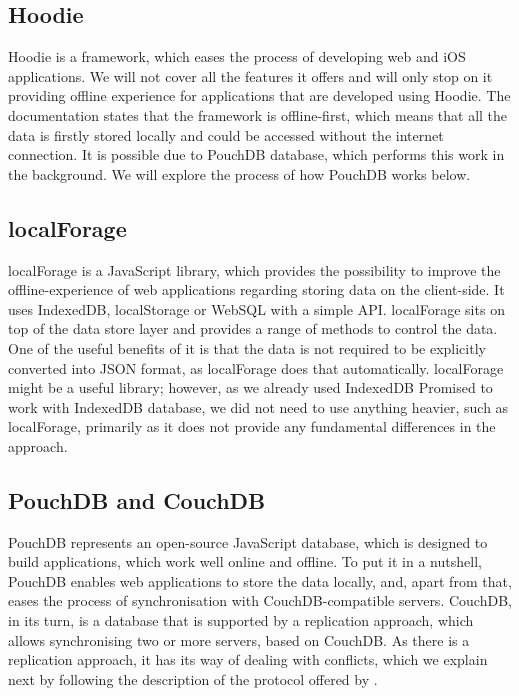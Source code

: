 \subsection*{Hoodie}

Hoodie is a framework, which eases the process of developing web and iOS applications. We will not cover all the features it offers and will only stop on it providing offline experience for applications that are developed using Hoodie. The documentation states that the framework is offline-first\cite{23}, which means that all the data is firstly stored locally and could be accessed without the internet connection. It is possible due to PouchDB database, which performs this work in the background\cite{24}. We will explore the process of how PouchDB works below.

\subsection*{localForage}

localForage is a JavaScript library, which provides the possibility to improve the offline-experience of web applications regarding storing data on the client-side. It uses IndexedDB, localStorage or WebSQL with a simple API. localForage sits on top of the data store layer and provides a range of methods to control the data. One of the useful benefits of it is that the data is not required to be explicitly converted into JSON format, as localForage does that automatically\cite{25}. localForage might be a useful library; however, as we already used IndexedDB Promised to work with IndexedDB database, we did not need to use anything heavier, such as localForage, primarily as it does not provide any fundamental differences in the approach.

\subsection*{PouchDB and CouchDB}

PouchDB represents an open-source JavaScript database, which is designed to build applications, which work well online and offline. To put it in a nutshell, PouchDB enables web applications to store the data locally, and, apart from that, eases the process of synchronisation with CouchDB-compatible servers. CouchDB, in its turn, is a database that is supported by a replication approach, which allows synchronising two or more servers, based on CouchDB. As there is a replication approach, it has its way of dealing with conflicts, which we explain next by following the description of the protocol offered by \citet{26}. 

